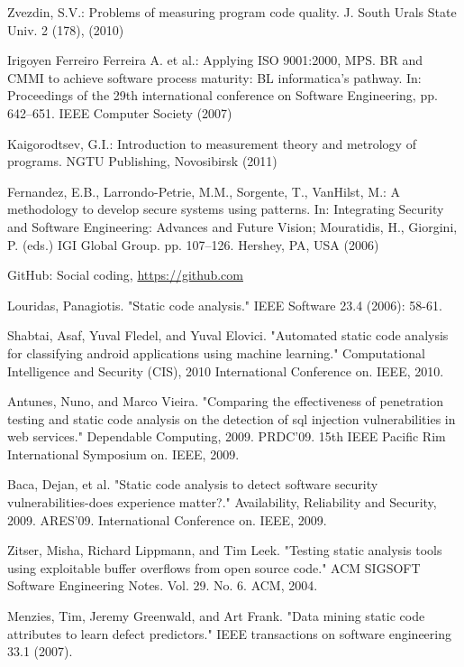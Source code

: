 \documentclass[runningheads,a4paper]{llncs}
\begin{document}
\begin{thebibliography}{4}

 Zvezdin, S.V.: Problems of measuring program code
  quality. J. South Urals State Univ. 2 (178), (2010)

 Irigoyen Ferreiro Ferreira A. et al.: Applying
  ISO 9001:2000, MPS. BR and CMMI to achieve software process
  maturity: BL informatica's pathway. In: Proceedings of the 29th international
  conference on Software Engineering, pp. 642--651. IEEE Computer Society (2007)

 Kaigorodtsev, G.I.: Introduction to measurement theory and
  metrology of programs. NGTU Publishing, Novosibirsk (2011)
  
 Fernandez, E.B., Larrondo-Petrie, M.M., Sorgente, T.,
  VanHilst, M.: A methodology to develop secure systems using patterns. In:
  Integrating Security and Software Engineering: Advances and Future Vision;
  Mouratidis, H., Giorgini, P. (eds.) IGI Global Group. pp. 107--126. Hershey,
  PA, USA (2006)
 
 GitHub: Social coding, \url{https://github.com}

 Louridas, Panagiotis. "Static code analysis." IEEE Software 23.4 (2006): 58-61.

 Shabtai, Asaf, Yuval Fledel, and Yuval Elovici. "Automated static code analysis for classifying android applications using machine learning." Computational Intelligence and Security (CIS), 2010 International Conference on. IEEE, 2010.

 Antunes, Nuno, and Marco Vieira. "Comparing the effectiveness of penetration testing and static code analysis on the detection of sql injection vulnerabilities in web services." Dependable Computing, 2009. PRDC'09. 15th IEEE Pacific Rim International Symposium on. IEEE, 2009.

 Baca, Dejan, et al. "Static code analysis to detect software security vulnerabilities-does experience matter?." Availability, Reliability and Security, 2009. ARES'09. International Conference on. IEEE, 2009.

 Zitser, Misha, Richard Lippmann, and Tim Leek. "Testing static analysis tools using exploitable buffer overflows from open source code." ACM SIGSOFT Software Engineering Notes. Vol. 29. No. 6. ACM, 2004.

 Menzies, Tim, Jeremy Greenwald, and Art Frank. "Data mining static code attributes to learn defect predictors." IEEE transactions on software engineering 33.1 (2007).


\end{thebibliography}
\end{document}
